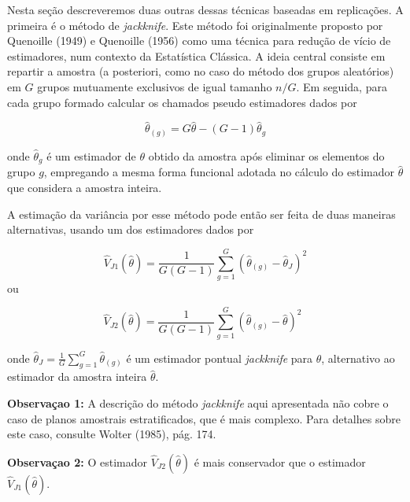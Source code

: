 \documentclass[
  12pt,
  brazilian,
]{book}
\theoremstyle{definition}
\theoremstyle{definition}
\theoremstyle{definition}
\theoremstyle{definition}
\theoremstyle{remark}
\begin{document}
Nesta seção descreveremos duas outras dessas técnicas baseadas em replicações. A primeira é o método de \emph{jackknife}. Este método foi originalmente proposto por Quenoille (1949) e Quenoille (1956) como uma técnica para redução de vício de estimadores, num contexto da Estatística Clássica. A ideia central consiste em repartir a amostra (a posteriori, como no caso do método dos grupos aleatórios) em \(G\) grupos mutuamente exclusivos de igual tamanho \(n/G\). Em seguida, para cada grupo formado calcular os chamados pseudo estimadores dados por

\[
\widehat{\theta }_{\left( g\right) }=G\widehat{\theta }-\left( G-1\right) 
\widehat{\theta }_{g} 
\]

onde \(\widehat{\theta }_{g}\) é um estimador de \(\theta\) obtido da amostra após eliminar os elementos do grupo \(g\), empregando a mesma forma funcional adotada no cálculo do estimador \(\widehat{\theta}\) que considera a amostra inteira.

A estimação da variância por esse método pode então ser feita de duas maneiras alternativas, usando um dos estimadores dados por

\begin{equation}
\widehat{V}_{J1}\left( \widehat{\theta }\right) =\frac{1}{G\left( G-1\right) 
}\sum_{g=1}^{G}\left( \widehat{\theta }_{\left( g\right) }-\widehat{\theta }
_{J}\right) ^{2}  \label{eq:estpa27}
\end{equation}
ou

\begin{equation}
\widehat{V}_{J2}\left( \widehat{\theta }\right) =\frac{1}{G\left( G-1\right) 
}\sum_{g=1}^{G}\left( \widehat{\theta }_{\left( g\right) }-\widehat{\theta }
\right) ^{2} \,\,\, \label{eq:estpa28}
\end{equation}

onde \(\widehat{\theta }_{J} = \frac{1}{G} \sum_{g=1}^{G} \widehat{\theta }_{\left( g\right)}\) é um estimador pontual \emph{jackknife} para \(\theta\), alternativo ao estimador da amostra inteira \(\hat{\theta}\).

\textbf{Observaçao 1:} A descrição do método \emph{jackknife} aqui apresentada não cobre o caso de planos amostrais estratificados, que é mais complexo. Para detalhes sobre este caso, consulte Wolter (1985), pág. 174.

\textbf{Observaçao 2:} O estimador \(\widehat{V}_{J2}\left( \widehat{\theta }\right)\) é mais conservador que o estimador \(\widehat{V}_{J1}\left( \widehat{\theta }\right)\).
\end{document}
